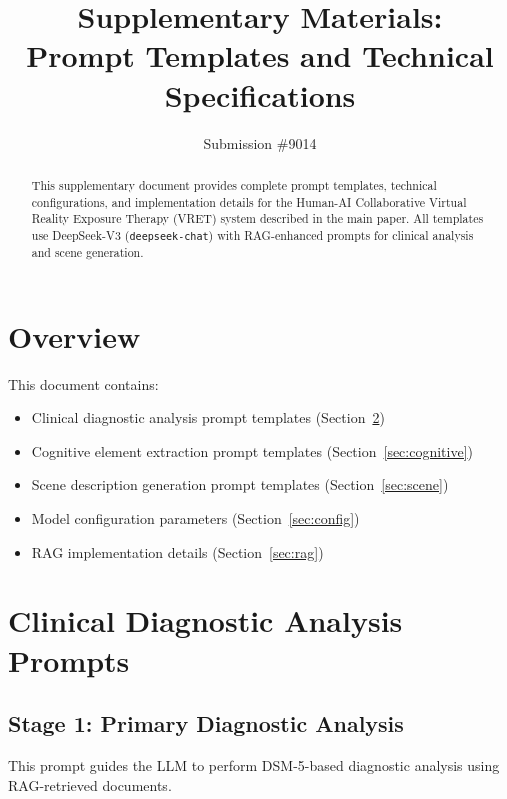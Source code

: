 \documentclass[sigconf,review,anonymous]{acmart}
\begin{document}
\title{Supplementary Materials:\\Prompt Templates and Technical Specifications}

\author{Submission \#9014}
\affiliation{}

\renewcommand{\shortauthors}{Submission \#9014}

\begin{abstract}
This supplementary document provides complete prompt templates, technical configurations, and implementation details for the Human-AI Collaborative Virtual Reality Exposure Therapy (VRET) system described in the main paper. All templates use DeepSeek-V3 (\texttt{deepseek-chat}) with RAG-enhanced prompts for clinical analysis and scene generation.
\end{abstract}

\maketitle

\section{Overview}

This document contains:
\begin{itemize}
\item Clinical diagnostic analysis prompt templates (Section~\ref{sec:clinical})
\item Cognitive element extraction prompt templates (Section~\ref{sec:cognitive})
\item Scene description generation prompt templates (Section~\ref{sec:scene})
\item Model configuration parameters (Section~\ref{sec:config})
\item RAG implementation details (Section~\ref{sec:rag})
\end{itemize}

\section{Clinical Diagnostic Analysis Prompts}
\label{sec:clinical}

\subsection{Stage 1: Primary Diagnostic Analysis}

This prompt guides the LLM to perform DSM-5-based diagnostic analysis using RAG-retrieved documents.
\end{document}
